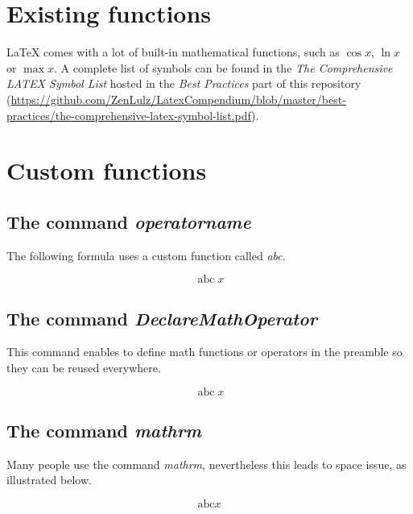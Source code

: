 \documentclass{article}
\DeclareMathOperator{\abc}{abc}
\begin{document}
	
\section*{Existing functions}

\LaTeX{} comes with a lot of built-in mathematical functions, such as $\cos x$, $\ln x$ or $\max x$.
A complete list of symbols can be found in the \emph{The Comprehensive LATEX Symbol List} hosted in the \emph{Best Practices} part of this repository (\url{https://github.com/ZenLulz/LatexCompendium/blob/master/best-practices/the-comprehensive-latex-symbol-list.pdf}).

\section*{Custom functions}
\subsection*{The command \emph{operatorname}}

The following formula uses a custom function called \emph{abc}.

\[\operatorname{abc} x\]

\subsection*{The command \emph{DeclareMathOperator}}

This command enables to define math functions or operators in the preamble so they can be reused everywhere.

\[\abc x\]

\subsection*{The command \emph{mathrm}}

Many people use the command \emph{mathrm}, nevertheless this leads to space issue, as illustrated below.

\[\mathrm{abc}x\]
\end{document}
